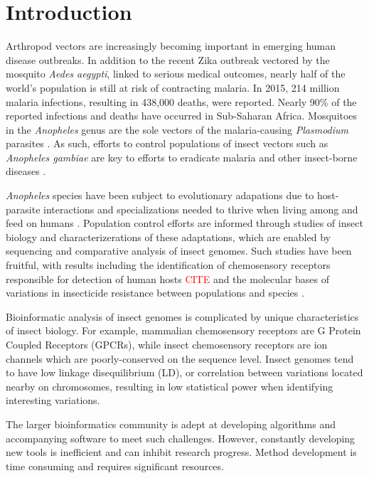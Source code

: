 \chapter{Introduction}

Arthropod vectors are increasingly becoming important in emerging human disease outbreaks.  In addition to the recent Zika outbreak vectored by the mosquito \emph{Aedes aegypti}, linked to serious medical outcomes, nearly half of the world's population is still at risk of contracting malaria.  In 2015, 214 million malaria infections, resulting in 438,000 deaths, were reported. Nearly 90\% of the reported infections and deaths have occurred in Sub-Saharan Africa.  Mosquitoes in the \emph{Anopheles} genus are the sole vectors of the malaria-causing \emph{Plasmodium} parasites \cite{Neafsey2015,Neafsey2010,Lawniczak2010}. As such, efforts to control populations of insect vectors such as \emph{Anopheles gambiae} are key to efforts to eradicate malaria and other insect-borne diseases \cite{Holt2002}.

\emph{Anopheles} species have been subject to evolutionary adapations due to host-parasite interactions and specializations needed to thrive when living among and feed on humans \cite{Neafsey2015}. Population control efforts are informed through studies of insect biology and characterizerations of these adaptations, which are enabled by sequencing and comparative analysis of insect genomes.   Such studies have been fruitful, with results including the identification of chemosensory receptors responsible for detection of human hosts \textcolor{red}{CITE} and the molecular bases of variations in insecticide resistance between populations and species \cite{Lawniczak2010}.

Bioinformatic analysis of insect genomes is complicated by unique characteristics of insect biology.  For example, mammalian chemosensory receptors are G Protein Coupled Receptors (GPCRs), while insect chemosensory receptors are ion channels which are poorly-conserved on the sequence level.  Insect genomes tend to have low linkage disequilibrium (LD), or correlation  between variations located nearby on chromosomes, resulting in low statistical power when identifying interesting variations.

The larger bioinformatics community is adept at developing algorithms and accompanying software to meet such challenges.  However, constantly developing new tools is inefficient and can inhibit research progress.  Method development is time consuming and requires significant resources.

